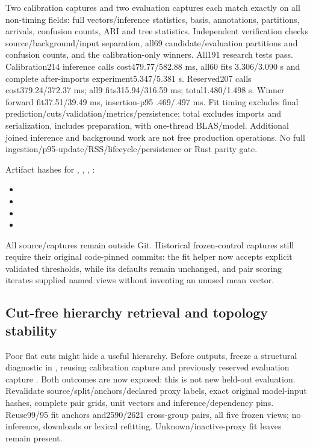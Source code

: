 \documentclass[11pt]{article}
\begin{document}
Two calibration captures and two evaluation captures each match exactly on all
non-timing fields: full vectors/inference statistics, basis, annotations,
partitions, arrivals, confusion counts, ARI and tree statistics. Independent
verification checks source/background/input separation, all69 candidate/evaluation
partitions and confusion counts, and the calibration-only winners. All191 research
tests pass. Calibration214 inference calls cost479.77/582.88 ms, all60 fits
3.306/3.090 s and complete after-imports experiment5.347/5.381 s. Reserved207
calls cost379.24/372.37 ms; all9 fits315.94/316.59 ms; total1.480/1.498 s.
Winner forward fit37.51/39.49 ms, insertion-p95 .469/.497 ms. Fit timing excludes
final prediction/cuts/validation/metrics/persistence; total excludes imports and
serialization, includes preparation, with one-thread BLAS/model. Additional joined
inference and background work are not free production operations. No full
ingestion/p95-update/RSS/lifecycle/persistence or Rust parity gate.

Artifact hashes for , ,
, :
\begin{itemize}
\item {}
\item {}
\item {}
\item {}
\end{itemize}
All source/captures remain outside Git. Historical frozen-control captures still
require their original code-pinned commits: the fit helper now accepts explicit
validated thresholds, while its defaults remain unchanged, and pair scoring
iterates supplied named views without inventing an unused mean vector.

\subsection{Cut-free hierarchy retrieval and topology stability}
Poor flat cuts might hide a useful hierarchy. Before outputs, freeze a structural
diagnostic in , reusing calibration
capture 
and previously reserved evaluation capture
.
Both outcomes are now exposed: this is not new held-out evaluation. Revalidate
source/split/anchors/declared proxy labels, exact original model-input hashes,
complete pair grids, unit vectors and inference/dependency pins. Reuse99/95 fit
anchors and2590/2621 cross-group pairs, all five frozen views; no inference,
downloads or lexical refitting. Unknown/inactive-proxy fit leaves remain present.
\end{document}
